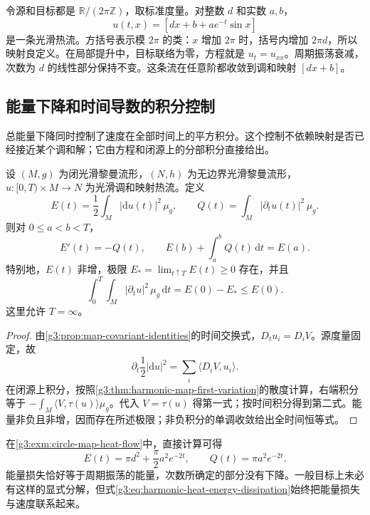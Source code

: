 \begin{example}\label{g3:exm:circle-map-heat-flow}
	令源和目标都是 \(\mathbb R/(2\pi\mathbb Z)\)，取标准度量。对整数 \(d\) 和实数 \(a,b\)，
	\[
		u(t,x)=[dx+b+a e^{-t}\sin x]
	\]
	是一条光滑热流。方括号表示模 \(2\pi\) 的类：\(x\) 增加 \(2\pi\) 时，括号内增加 \(2\pi d\)，所以映射良定义。在局部提升中，目标联络为零，方程就是 \(u_t=u_{xx}\)。周期振荡衰减，次数为 \(d\) 的线性部分保持不变。这条流在任意阶都收敛到调和映射 \([dx+b]\)。
\end{example}

\subsection{能量下降和时间导数的积分控制}
\label{g3:subsec:2603:02}
总能量下降同时控制了速度在全部时间上的平方积分。这个控制不依赖映射是否已经接近某个调和解；它由方程和闭源上的分部积分直接给出。

\begin{theorem}\label{g3:thm:harmonic-heat-energy}
	设 \((M,g)\) 为闭光滑黎曼流形，\((N,h)\) 为无边界光滑黎曼流形，\(u:[0,T)\times M\to N\) 为光滑调和映射热流。定义
	\[
		E(t)=\frac12\int_M|\mathrm du(t)|^2\,\mu_g,
		\qquad Q(t)=\int_M|\partial_tu(t)|^2\,\mu_g.
	\]
	则对 \(0\le a<b<T\)，
	\begin{equation}\label{g3:eq:harmonic-heat-energy-dissipation}
		E'(t)=-Q(t),\qquad E(b)+\int_a^bQ(t)\,\mathrm dt=E(a).
	\end{equation}
	特别地，\(E(t)\) 非增，极限 \(E_* =\lim_{t\uparrow T}E(t)\ge0\) 存在，并且
	\[
		\int_0^T\!\int_M|\partial_tu|^2\,\mu_g\,\mathrm dt
		=E(0)-E_*\le E(0).
	\]
	这里允许 \(T=\infty\)。
\end{theorem}
\begin{proof}
	由\cref{g3:prop:map-covariant-identities}的时间交换式，\(D_tu_i=D_iV\)。源度量固定，故
	\[
		\partial_t\frac12|\mathrm du|^2=\sum_i\langle D_iV,u_i\rangle.
	\]
	在闭源上积分，按照\cref{g3:thm:harmonic-map-first-variation}的散度计算，右端积分等于 \(-\int_M\langle V,\tau(u)\rangle\mu_g\)。代入 \(V=\tau(u)\) 得第一式；按时间积分得到第二式。能量非负且非增，因而存在所述极限；非负积分的单调收敛给出全时间恒等式。
\end{proof}

在\cref{g3:exm:circle-map-heat-flow}中，直接计算可得
\[
	E(t)=\pi d^2+\frac\pi2a^2e^{-2t},\qquad Q(t)=\pi a^2e^{-2t}.
\]
能量损失恰好等于周期振荡的能量，次数所确定的部分没有下降。一般目标上未必有这样的显式分解，但式\eqref{g3:eq:harmonic-heat-energy-dissipation}始终把能量损失与速度联系起来。

